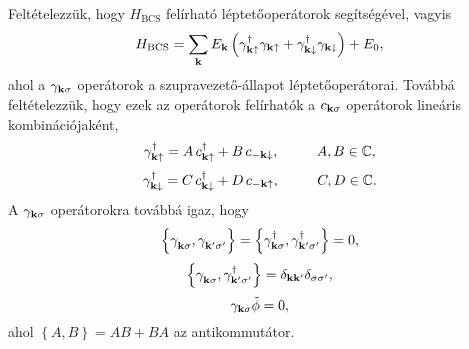 \documentclass[a4paper,12pt,titlepage]{article}
\newcommand{\KK}{{\vb{k}}}
\newcommand{\phantomdagger}{{\phantom{\dagger}}}
\begin{document}
Feltételezzük, hogy $H_\text{BCS}$ felírható léptetőoperátorok segítségével, vagyis
\begin{equation} \label{H-BCS}
	H_\text{BCS} = \sum\limits_\KK E_\KK \left( \gamma_{\KK \uparrow}^\dagger \gamma_{\KK \uparrow} + \gamma_{\KK \downarrow}^\dagger \gamma_{\KK \downarrow} \right) + E_0,
\end{equation}
ahol a $\gamma_{\KK \sigma}$ operátorok a szupravezető-állapot léptetőoperátorai.  Továbbá feltételezzük, hogy ezek az operátorok felírhatók a $c_{\KK \sigma}$ operátorok lineáris kombinációjaként,
\begin{equation} \label{gamma-from-c}
	\gamma_{\KK \uparrow}^\dagger = A \, c_{\KK \uparrow}^\dagger + B \, c_{-\KK \downarrow}, ~~~~~~~~ A, B \in \mathbb{C},
\end{equation}
\begin{equation}
	\gamma_{\KK \downarrow}^\dagger = C \, c_{\KK \downarrow}^\dagger + D \, c_{-\KK \uparrow}, ~~~~~~~~ C, D \in \mathbb{C}.
\end{equation}
A $\gamma_{\KK \sigma}$ operátorokra továbbá igaz, hogy
\begin{equation} \label{gamma-anticommutator-zero}
	\left\{ \gamma_{\KK \sigma}^\phantomdagger, \gamma_{\KK^\prime \sigma^\prime}^\phantomdagger \right\} = \left\{ \gamma_{\KK \sigma}^\dagger, \gamma_{\KK^\prime \sigma^\prime}^\dagger \right\} = 0,
\end{equation}
\begin{equation} \label{gamma-anticommutator}
	\left\{ \gamma_{\KK \sigma}^\phantomdagger, \gamma_{\KK^\prime \sigma^\prime}^\dagger \right\} = \delta_{\KK \KK^\prime} \delta_{\sigma \sigma^\prime},
\end{equation}
\begin{equation} \label{gamma-zero}
	\gamma_{\KK \sigma} \tilde{\phi} = 0,
\end{equation}
ahol $\left\{ A, B \right\} = A B + B A$ az antikommutátor.
\end{document}
